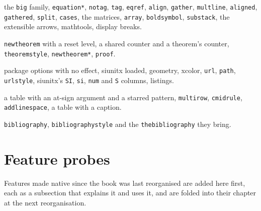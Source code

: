 \documentclass{article}
\numberwithin{equation}{section}
\theoremstyle{definition}
\theoremstyle{remark}
\begin{document}
\begin{description}
        the \texttt{big} family, \texttt{equation*}, \texttt{notag}, \texttt{tag},
        \texttt{eqref}, \texttt{align}, \texttt{gather}, \texttt{multline},
        \texttt{aligned}, \texttt{gathered}, \texttt{split}, \texttt{cases}, the
        matrices, \texttt{array}, \texttt{boldsymbol}, \texttt{substack}, the extensible
        arrows, mathtools, display breaks.
  \item[Section~\ref{sec:theorems}] \texttt{newtheorem} with a reset level, a shared
        counter and a theorem's counter, \texttt{theoremstyle}, \texttt{newtheorem*},
        \texttt{proof}.
  \item[Section~\ref{sec:packages}] package options with no effect, siunitx loaded,
        geometry, xcolor, \texttt{url}, \texttt{path}, \texttt{urlstyle}, siunitx's
        \texttt{SI}, \texttt{si}, \texttt{num} and \texttt{S} columns, listings.
  \item[Sections \ref{sec:pdf} to \ref{sec:limits}] a table with an at-sign argument
        and a starred pattern, \texttt{multirow}, \texttt{cmidrule},
        \texttt{addlinespace}, a table with a caption.
  \item[Section~\ref{sec:bib}] \texttt{bibliography}, \texttt{bibliographystyle} and
        the \texttt{thebibliography} they bring.
\end{description}

\section{Feature probes}\label{sec:probes}
Features made native since the book was last reorganised are added here first, each as a
subsection that explains it and uses it, and are folded into their chapter at the next
reorganisation.
\end{document}
